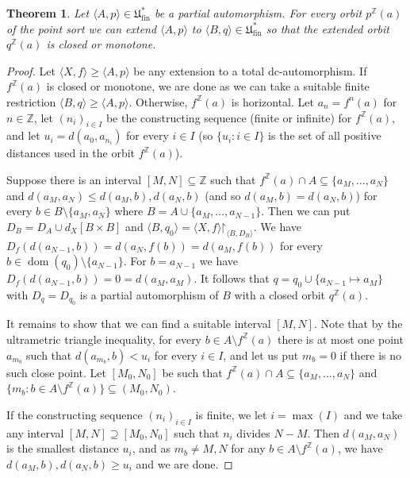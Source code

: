\documentclass[10pt,a4paper]{article}
\newtheorem{tw}{Theorem}[section]
\theoremstyle{definition}
\theoremstyle{remark}
\newcommand \set [1]{\{#1\}}
\newcommand \seq [1]{\langle #1 \rangle}
\newcommand \im [1]{[#1]} %
\newcommand \restr [1] {\mathord{\upharpoonright}_{#1}}
\newcommand \dom {\operatorname{dom}}
\newcommand \subs {\subseteq}
\newcommand \Z {\mathbb{Z}}
\newcommand \fin {{\operatorname{fin}}}
\newcommand \Ult {\mathfrak{U}}
\begin{document}
\color{black}
\begin{tw}\label{closedormonotone}
    Let $\seq{A, p} \in \Ult^*_\fin$ be a partial automorphism.
    For every orbit $p^\Z(a)$ of the point sort we can extend $\seq{A, p}$ to $\seq{B, q} \in \Ult^*_\fin$ so that the extended orbit $q^\Z(a)$ is closed or monotone.
\end{tw}
\begin{proof}
    Let $\seq{X, f} \geq \seq{A, p}$ be any extension to a total dc-automorphism.
    If $f^\Z(a)$ is closed or monotone, we are done as we can take a suitable finite restriction $\seq{B, q} \geq \seq{A, p}$.
    Otherwise, $f^\Z(a)$ is horizontal.
    Let $a_n = f^n(a)$ for $n \in \Z$, let $(n_i)_{i \in I}$ be the constructing sequence (finite or infinite) for $f^\Z(a)$, and let $u_i = d(a_0, a_{n_i})$ for every $i \in I$ (so $\set{u_i: i \in I}$ is the set of all positive distances used in the orbit $f^\Z(a)$).

    Suppose there is an interval $[M, N] \subs \Z$ such that $f^\Z(a) \cap A \subs \set{a_M, \ldots, a_N}$ and $d(a_M, a_N) \leq d(a_M, b), d(a_N, b)$ (and so $d(a_M, b) = d(a_N, b)$) for every $b \in B \setminus \set{a_M, a_N}$ where $B = A \cup \set{a_M, \ldots, a_{N - 1}}$.
    Then we can put $D_B = D_A \cup d_X\im{B \times B}$ and $\seq{B, q_0} = \seq{X, f}\restr{\seq{B, D_B}}$.
    We have $D_f(d(a_{N - 1}, b)) = d(a_N, f(b)) = d(a_M, f(b))$ for every $b \in \dom(q_0) \setminus \set{a_{N - 1}}$.
    For $b = a_{N - 1}$ we have $D_f(d(a_{N - 1}, b)) = 0 = d(a_M, a_M)$.
    It follows that $q = q_0 \cup \set{a_{N - 1} \mapsto a_M}$ with $D_q = D_{q_0}$ is a partial automorphism of $B$ with a closed orbit $q^\Z(a)$.

    It remains to show that we can find a suitable interval $[M, N]$.
    Note that by the ultrametric triangle inequality, for every $b \in A \setminus f^\Z(a)$ there is at most one point $a_{m_b}$ such that $d(a_{m_b}, b) < u_i$ for every $i \in I$, and let us put $m_b = 0$ if there is no such close point.
    Let $[M_0, N_0]$ be such that $f^\Z(a) \cap A \subs \set{a_M, \ldots, a_N}$ and $\set{m_b: b \in A \setminus f^\Z(a)} \subs (M_0, N_0)$.
    
    If the constructing sequence $(n_i)_{i \in I}$ is finite, we let $i = \max(I)$ and we take any interval $[M, N] \supseteq [M_0, N_0]$ such that $n_i$ divides $N - M$.
    Then $d(a_M, a_N)$ is the smallest distance $u_i$, and as $m_b \neq M, N$ for any $b \in A \setminus f^\Z(a)$, we have $d(a_M, b), d(a_N, b) \geq u_i$ and we are done.


\end{proof}
\end{document}
